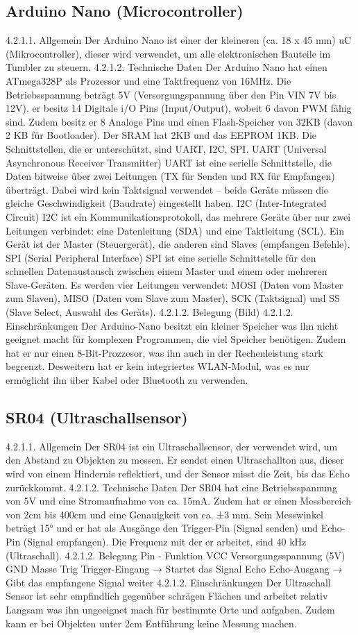 \subsection{Arduino Nano (Microcontroller)}
%
4.2.1.1. Allgemein
Der Arduino Nano ist einer der kleineren (ca. 18 x 45 mm) uC (Mikrocontroller), dieser wird verwendet, um alle elektronischen Bauteile im Tumbler zu steuern.
4.2.1.2. Technische Daten
Der Arduino Nano hat einen ATmega328P als Prozessor und eine Taktfrequenz von 16MHz. Die Betriebsspannung beträgt 5V (Versorgungspannung über den Pin VIN 7V bis 12V). er besitz 14 Digitale i/O Pins (Input/Output), wobeit 6 davon PWM fähig sind. Zudem besitz er 8 Analoge Pins und einen Flash-Speicher von 32KB (davon 2 KB für Bootloader). Der SRAM hat 2KB und das EEPROM 1KB. Die Schnittstellen, die er unterschützt, sind UART, I2C, SPI.
UART (Universal Asynchronous Receiver Transmitter)
UART ist eine serielle Schnittstelle, die Daten bitweise über zwei Leitungen (TX für Senden und RX für Empfangen) überträgt. Dabei wird kein Taktsignal verwendet – beide Geräte müssen die gleiche Geschwindigkeit (Baudrate) eingestellt haben.
I2C (Inter-Integrated Circuit)
I2C ist ein Kommunikationsprotokoll, das mehrere Geräte über nur zwei Leitungen verbindet: eine Datenleitung (SDA) und eine Taktleitung (SCL). Ein Gerät ist der Master (Steuergerät), die anderen sind Slaves (empfangen Befehle).
SPI (Serial Peripheral Interface)
SPI ist eine serielle Schnittstelle für den schnellen Datenaustausch zwischen einem Master und einem oder mehreren Slave-Geräten. Es werden vier Leitungen verwendet: MOSI (Daten vom Master zum Slaven), MISO (Daten vom Slave zum Master), SCK (Taktsignal) und SS (Slave Select, Auswahl des Geräts).
4.2.1.2. Belegung
(Bild)
4.2.1.2. Einschränkungen
Der Arduino-Nano besitzt ein kleiner Speicher was ihn  nicht geeignet macht für komplexen Programmen, die viel Speicher benötigen. Zudem hat er nur einen 8-Bit-Prozzesor, was ihn auch in der Rechenleistung stark begrenzt. Desweitern hat er kein integriertes WLAN-Modul, was es nur ermöglicht ihn  über Kabel oder Bluetooth zu verwenden.
%
\subsection{SR04 (Ultraschallsensor)}
%
4.2.1.1. Allgemein
Der SR04 ist ein Ultraschallsensor, der verwendet wird, um den Abstand zu Objekten zu messen. Er sendet einen Ultraschallton aus, dieser wird von einem Hindernis reflektiert, und der Sensor misst die Zeit, bis das Echo zurückkommt.
4.2.1.2. Technische Daten
Der SR04 hat eine Betriebsspannung von 5V und eine Stromaufnahme von ca. 15mA. Zudem hat er einen Messbereich von 2cm bis 400cm und eine Genauigkeit von ca. ±3 mm. Sein Messwinkel beträgt 15° und er hat als Ausgänge den Trigger-Pin (Signal senden) und Echo-Pin (Signal empfangen). Die Frequenz mit der er arbeitet, sind 40 kHz (Ultraschall).
4.2.1.2. Belegung
Pin  -   	Funktion
VCC	Versorgungsspannung (5V)
GND	Masse
Trig	Trigger-Eingang → Startet das Signal
Echo	Echo-Ausgang → Gibt das empfangene Signal weiter
4.2.1.2. Einschränkungen
Der Ultraschall Sensor ist sehr empfindlich gegenüber schrägen Flächen und arbeitet relativ Langsam was ihn ungeeignet mach für bestimmte Orte und aufgaben. Zudem kann er bei Objekten unter 2cm Entführung keine Messung machen.
%
